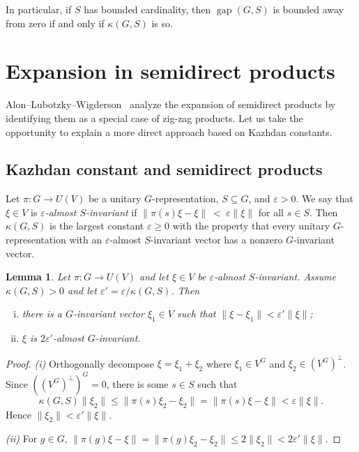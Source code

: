 \documentclass[11pt]{amsart}
\numberwithin{equation}{section}
\newtheorem{lemma}[theorem]{Lemma}
\theoremstyle{remark}
\newcommand{\op}{\operatorname}
\newcommand{\gap}{\op{gap}}
\newcommand\eps{\varepsilon}
\def\kaz{\kappa}
\begin{document}
In particular, if $S$ has bounded cardinality,
then $\gap(G, S)$ is bounded away from zero if and only if $\kaz(G, S)$ is so.



\vspace{0.1cm}
\section{Expansion in semidirect products}

Alon--Lubotzky--Wigderson~\cite{ALW01} analyze the expansion of semidirect products by identifying them as a special case of zig-zag products. Let us take the opportunity to explain a more direct approach based on Kazhdan constants.

\subsection{Kazhdan constant and semidirect products}

Let $\pi \colon G \to U(V)$ be a unitary $G$-representation, $S \subseteq G$, and $\eps > 0$.
We say that $\xi \in V$ is \emph{$\eps$-almost $S$-invariant} if
\(
    \| \pi(s)\xi - \xi \| \> < \> \eps \| \xi \|
\)
for all $s \in S$.
Then $\kaz(G, S)$ is the largest constant $\eps \ge 0$ with the property that every unitary $G$-representation with an $\eps$-almost $S$-invariant vector has a nonzero $G$-invariant vector.

\begin{lemma} \label{lemSean1}
    Let $\pi \colon G \to U(V)$ and let $\xi \in V$ be $\eps$-almost $S$-invariant.
    Assume $\kaz(G, S) > 0$ and let $\eps' = \eps / \kaz(G, S)$.
    Then
    \begin{enumerate}[(i)]
        \item there is a $G$-invariant vector $\xi_1 \in V$ such that $\|\xi - \xi_1\| < \eps'\|\xi\|$;
        \item $\xi$ is $2\eps'$-almost $G$-invariant.
    \end{enumerate}
\end{lemma}
\begin{proof}
    \emph{(i)}
    Orthogonally decompose $\xi = \xi_1 + \xi_2$ where $\xi_1 \in V^G$ and $\xi_2 \in (V^G)^\perp$.
    Since $((V^G)^\perp)^G = 0$, there is some $s \in S$ such that
    \[
        \kaz(G, S) \|\xi_2\| \le \|\pi(s) \xi_2 - \xi_2\| = \|\pi(s) \xi - \xi\| < \eps \|\xi\|.
    \]
    Hence $\|\xi_2\| < \eps' \|\xi\|$.

    \emph{(ii)}
    For $g \in G$, $\|\pi(g) \xi - \xi\| = \|\pi(g) \xi_2 - \xi_2\| \le 2 \|\xi_2\| < 2\eps' \|\xi\|.$
\end{proof}
\end{document}
